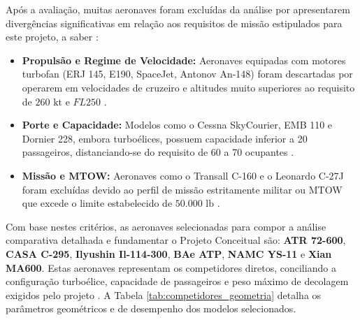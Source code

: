 Após a avaliação, muitas aeronaves foram excluídas da análise por apresentarem divergências significativas em relação aos requisitos de missão estipulados para este projeto, a saber \cite{medeiros2026}:

\begin{itemize}
    \item \textbf{Propulsão e Regime de Velocidade:} Aeronaves equipadas com motores turbofan (ERJ 145, E190, SpaceJet, Antonov An-148) foram descartadas por operarem em velocidades de cruzeiro e altitudes muito superiores ao requisito de $260 \text{ kt}$ e $FL250$ \cite{medeiros2026}.
    \item \textbf{Porte e Capacidade:} Modelos como o Cessna SkyCourier, EMB 110 e Dornier 228, embora turboélices, possuem capacidade inferior a 20 passageiros, distanciando-se do requisito de 60 a 70 ocupantes \cite{medeiros2026}.
    \item \textbf{Missão e MTOW:} Aeronaves como o Transall C-160 e o Leonardo C-27J foram excluídas devido ao perfil de missão estritamente militar ou MTOW que excede o limite estabelecido de $50.000 \text{ lb}$ \cite{medeiros2026}.
\end{itemize}

Com base nestes critérios, as aeronaves selecionadas para compor a análise comparativa detalhada e fundamentar o Projeto Conceitual são: \textbf{ATR 72-600}, \textbf{CASA C-295}, \textbf{Ilyushin Il-114-300}, \textbf{BAe ATP}, \textbf{NAMC YS-11} e \textbf{Xian MA600}. Estas aeronaves representam os competidores diretos, conciliando a configuração turboélice, capacidade de passageiros e peso máximo de decolagem exigidos pelo projeto \cite{medeiros2026}. A Tabela \ref{tab:competidores_geometria} detalha os parâmetros geométricos e de desempenho dos modelos selecionados. 

